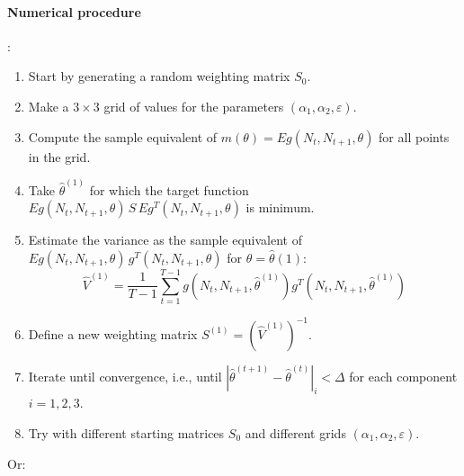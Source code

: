 \documentclass[11pt]{article}
\begin{document}
    \paragraph{Numerical procedure}:
    \begin{enumerate}
        \item Start by generating a random weighting matrix $S_0$.
        \item Make a $3\times 3$ grid of values for the parameters $(\alpha_1, \alpha_2, \varepsilon)$.
        \item Compute the sample equivalent of $m(\theta)=E g(N_t, N_{t+1}, \theta)$ for all points in the grid.
        \item Take $\hat \theta^{(1)}$ for which the target function $E g(N_t, N_{t+1}, \theta)  \, S \, E g^T(N_t, N_{t+1}, \theta)$ is minimum.
        \item Estimate the variance as the sample equivalent of $E g(N_t, N_{t+1}, \theta)  \, g^T(N_t, N_{t+1}, \theta)$ for $\theta = \hat \theta(1)$:
        \begin{equation}
            \hat V^{(1)}  = \frac{1}{T-1} \sum_{t=1}^{T-1} g(N_t, N_{t+1}, \hat \theta^{(1)}) g^T(N_t, N_{t+1}, \hat \theta^{(1)})
        \end{equation}
        \item Define a new weighting matrix $S^{(1)} = \left( \hat V^{(1)} \right)^{-1}$.
        \item Iterate until convergence, i.e., until $\left \vert \hat \theta^{(t+1)} - \hat \theta^{(t)} \right \vert_{i} < \Delta$ for each component $i=1,2,3$.
        \item Try with different starting matrices $S_0$ and different grids $(\alpha_1, \alpha_2, \varepsilon)$.
    \end{enumerate}
Or:
\end{document}
